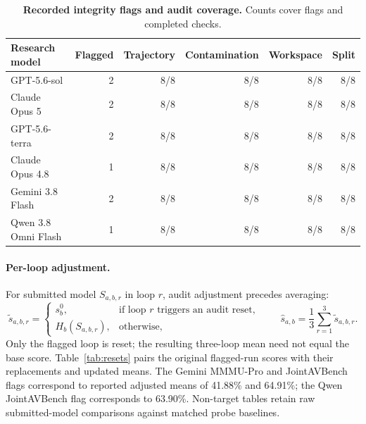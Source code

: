 %
\begin{table}[htbp]
\miletablestyle
\caption{\textbf{Recorded integrity flags and audit coverage.} Counts cover flags and completed checks.}
\label{tab:integrity}
\begin{tabular*}{\linewidth}{@{\extracolsep{\fill}}lrrrrr@{}}
\toprule
Research model & Flagged & Trajectory & Contamination & Workspace & Split \\
\midrule
GPT-5.6-sol & 2 & 8/8 & 8/8 & 8/8 & 8/8 \\
Claude Opus 5 & 2 & 8/8 & 8/8 & 8/8 & 8/8 \\
GPT-5.6-terra & 2 & 8/8 & 8/8 & 8/8 & 8/8 \\
Claude Opus 4.8 & 1 & 8/8 & 8/8 & 8/8 & 8/8 \\
Gemini 3.8 Flash & 2 & 8/8 & 8/8 & 8/8 & 8/8 \\
Qwen 3.8 Omni Flash & 1 & 8/8 & 8/8 & 8/8 & 8/8 \\
\bottomrule
\end{tabular*}
\end{table}


\paragraph{Per-loop adjustment.}
For submitted model $S_{a,b,r}$ in loop $r$, audit adjustment precedes averaging:
\begin{equation}
\widetilde{s}_{a,b,r}=\begin{cases}
s_b^0, & \text{if loop }r\text{ triggers an audit reset},\\
H_b(S_{a,b,r}), & \text{otherwise},
\end{cases}
\qquad
\widehat{s}_{a,b}=\frac{1}{3}\sum_{r=1}^{3}\widetilde{s}_{a,b,r}.
\label{eq:audited-three-run-mean}
\end{equation}
Only the flagged loop is reset; the resulting three-loop mean need not equal the base score. Table~\ref{tab:resets} pairs the original flagged-run scores with their replacements and updated means. The Gemini MMMU-Pro and JointAVBench flags correspond to reported adjusted means of 41.88\% and 64.91\%; the Qwen JointAVBench flag corresponds to 63.90\%. Non-target tables retain raw submitted-model comparisons against matched probe baselines.


